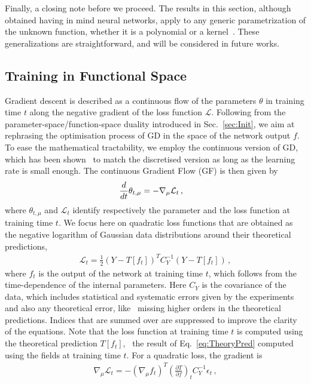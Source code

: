 Finally, a closing note before we proceed. The results in this section, although
obtained having in mind neural networks, apply to any generic parametrization of
the unknown function, whether it is a polynomial or a
kernel~\cite{Costantini:2025wxp}. These generalizations are straightforward, and
will be considered in future works.

\subsection{Training in Functional Space}
\label{sec:GradFlow}

Gradient descent is described as a continuous flow of the parameters $\theta$ in
training time $t$ along the negative gradient of the loss function
$\mathcal{L}$. Following from the parameter-space/function-space duality
introduced in Sec.~\ref{sec:Init}, we aim at rephrasing the optimisation process
of GD in the space of the network output $f$. To ease the mathematical
tractability, we employ the continuous version of GD, which has been
shown~\cite{barrett2022igr} to match the discretised version as long as the
learning rate is small enough. The continuous Gradient Flow (GF) is then given
by
\begin{align}
    \label{eq:GradientFlowDef}
    \frac{d}{dt} &\theta_{t,\mu} = -\nabla_\mu \mathcal{L}_t\, ,
\end{align}
where $\theta_{t,\mu}$ and $\mathcal{L}_t$ identify respectively the parameter
and the loss function at training time $t$. We focus here on quadratic loss
functions that are obtained as the negative logarithm of Gaussian data
distributions around their theoretical predictions,
\begin{align}
    \label{eq:QuadLoss}
    \mathcal{L}_t = \frac12 \left(Y - T[f_t]\right)^T C_Y^{-1} \left(Y - T[f_t]\right)\, ,
\end{align}
where $f_t$ is the output of the network at training time $t$, which follows
from the time-dependence of the internal parameters. Here $C_Y$ is the
covariance of the data, which includes statistical and systematic errors given
by the experiments and also any theoretical error, like \eg\ missing higher
orders in the theoretical predictions. Indices that are summed over are
suppressed to improve the clarity of the equations. Note that the loss function
at training time $t$ is computed using the theoretical prediction $T[f_t]$, \ie\
the result of Eq.~\eqref{eq:TheoryPred} computed using the fields at training
time $t$. For a quadratic loss, the gradient is
\begin{align}
    \nabla_\mu \mathcal{L}_t = - \left(\nabla_\mu f_t\right)^T \left(\frac{\partial T}{\partial f}\right)_t
      C_Y^{-1} \epsilon_t\, ,
\end{align}
